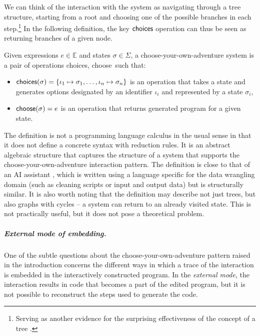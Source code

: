 \documentclass[a4paper,UKenglish,cleveref, autoref, thm-restate]{lipics-v2021}
\newcommand{\ident}[1]{\textsf{#1}}
\newcommand{\select}{\textnormal{\ident{choose}}}
\newcommand{\choices}{\textnormal{\ident{choices}}}
\begin{document}
We can think of the interaction with the system as navigating through a tree structure, starting
from a root and choosing one of the possible branches in each step.\footnote{Serving as another
evidence for the surprising effectiveness of the concept of a tree \cite{nesetril-2005-strom}.}
In the following definition, the key $\choices$ operation can thus be seen as returning
branches of a given node.

\begin{definition}\label{def:calculus}
Given expressions $e\in \mathbb{E}$ and states $\sigma \in \Sigma$, a choose-your-own-adventure
system is a pair of operations \choices, \select\ such that:

\vspace{-0.25em}
\raggedright
\begin{itemize}
  \item $\choices(\sigma) = \{\iota_1\mapsto\sigma_1, \ldots, \iota_n\mapsto\sigma_n\}$ is
    an operation that takes a state and \\ generates options designated by an identifier $\iota_i$
    and represented by a state $\sigma_i$,
  \item $\select(\sigma) = e$ is an operation that returns generated program for a given state.
\end{itemize}
\end{definition}

The definition is not a programming language calculus in the usual sense in that it does not
define a concrete syntax with reduction rules. It is an abstract algebraic structure that captures
the structure of a system that supports the choose-your-own-adventure interaction pattern.
The definition is close to that of an AI assistant \cite{petricek-2023-aias}, which is written
using a language specific for the data wrangling domain (such as cleaning scripts or input and
output data) but is structurally similar. It is also worth noting that the definition may describe
not just trees, but also graphs with cycles -- a system can return to an already visited state.
This is not practically useful, but it does not pose a theoretical problem.

\subparagraph{External mode of embedding.}
One of the subtle questions about the choose-your-own-adventure pattern raised in the introduction
concerns the different ways in which a trace of the interaction is embedded in the interactively
constructed program. In the \emph{external mode}, the interaction results in code that becomes a
part of the edited program, but it is not possible to reconstruct the steps used to generate the code.
\end{document}

